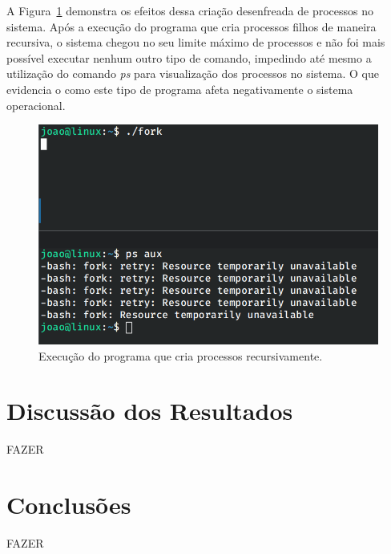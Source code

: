 \documentclass[
	12pt,				%
	oneside,   	        %
	a4paper,			%
	english,			%
	french,				%
	spanish,			%
	brazil,				%
	]{pacotes/abntex2}
\begin{document}
A Figura~\ref{fig:bomb} demonstra os efeitos dessa criação desenfreada de processos no sistema. Após a execução do programa que cria processos filhos de maneira recursiva, o sistema chegou no seu limite máximo de processos e não foi mais possível executar nenhum outro tipo de comando, impedindo até mesmo a utilização do comando \textit{ps} para visualização dos processos no sistema. O que evidencia o como este tipo de programa afeta negativamente o sistema operacional.

\begin{figure}[H]
  \centering
  \includegraphics[scale=0.5]{figuras/bomb.png}
  \caption{Execução do programa que cria processos recursivamente.}
  \label{fig:bomb}
\end{figure}

\section{Discussão dos Resultados}
\label{sec:discussao}

FAZER

\section{Conclusões}
\label{sec:conclusoes}

FAZER

\postextual
\renewcommand{\bibsection}{%
\section{\bibname}
\bibmark
\prebibhook}


\end{document}
